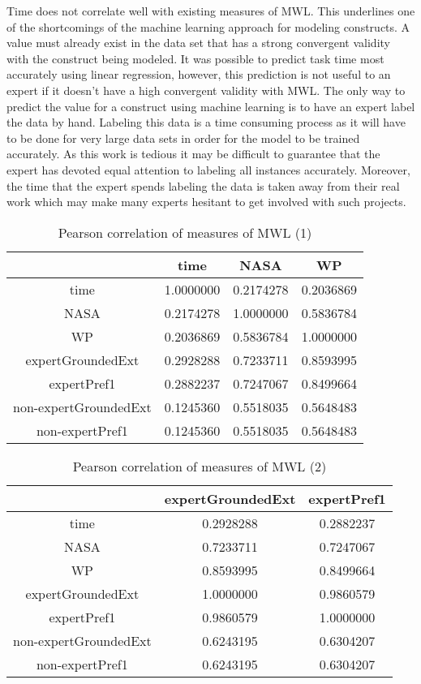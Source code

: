 Time does not correlate well with existing measures of MWL. This underlines one of the shortcomings of the machine learning approach for modeling constructs. A value must already exist in the data set that has a strong convergent validity with the construct being modeled. It was possible to predict task time most accurately using linear regression, however, this prediction is not useful to an expert if it doesn't have a high convergent validity with MWL. The only way to predict the value for a construct using machine learning is to have an expert label the data by hand. Labeling this data is a time consuming process as it will have to be done for very large data sets in order for the model to be trained accurately. As this work is tedious it may be difficult to guarantee that the expert has devoted equal attention to labeling all instances accurately. Moreover, the time that the expert spends labeling the data is taken away from their real work which may make many experts hesitant to get involved with such projects.

\begin{table}[!htbp]
\centering
\begin{tabular}{|c|c|c|c|}
\hline
                 &  time     & NASA      &  WP        \\ \hline
time             & 1.0000000 & 0.2174278 & 0.2036869  \\
NASA             & 0.2174278 & 1.0000000 & 0.5836784 \\
WP               & 0.2036869 & 0.5836784 & 1.0000000 \\
expertGroundedExt  & 0.2928288 & 0.7233711 & 0.8593995 \\
expertPref1        & 0.2882237 & 0.7247067 & 0.8499664 \\
non-expertGroundedExt & 0.1245360 & 0.5518035 & 0.5648483 \\
non-expertPref1       & 0.1245360 & 0.5518035 & 0.5648483 \\
\hline
\end{tabular}
\caption{Pearson correlation of measures of MWL (1)}
\label{tab:corrmwlone}
\end{table}

\begin{table}[!htbp]
\centering
\begin{tabular}{|c|c|c|}
\hline
                 & expertGroundedExt & expertPref1 \\ \hline
time             & 0.2928288 & 0.2882237        \\
NASA             & 0.7233711 & 0.7247067        \\
WP               & 0.8593995 & 0.8499664        \\
expertGroundedExt  & 1.0000000 & 0.9860579         \\
expertPref1        & 0.9860579 & 1.0000000        \\
non-expertGroundedExt & 0.6243195 & 0.6304207        \\
non-expertPref1       & 0.6243195 & 0.6304207        \\
\hline
\end{tabular}
\caption{Pearson correlation of measures of MWL (2)}
\label{tab:corrmwltwo}
\end{table}

